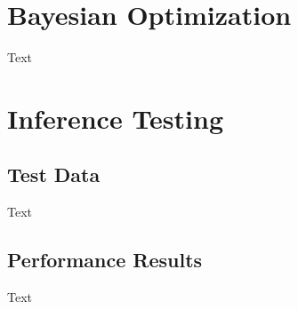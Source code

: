 \documentclass[twocolumn]{aastex631}
\begin{document}
\section{Bayesian Optimization}
Text

\section{Inference Testing}
\subsection{Test Data}
Text

\subsection{Performance Results}
Text
\end{document}
